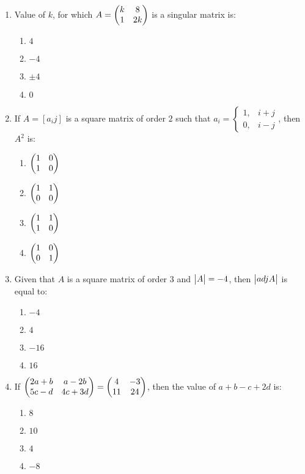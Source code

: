 \documentclass{article}
\begin{document}
\begin{enumerate}
   \item Value of $k$, for which $A =\begin{pmatrix}k & 8 \\ 1 & 2k\end{pmatrix}$ is a singular matrix is:
    \begin{enumerate}
        \item $4$
        \item $-4$
        \item $\pm4$
        \item $0$
    \end{enumerate}
        

    \item If $A = [a_{i}{j}]$ is a square matrix of order $2$ such that $a_{i} = \begin{cases}1, & i + j \\0, & i-j
    \end{cases}$, then $A^2$ is:
    \begin{enumerate}
        \item $\begin{pmatrix}1 & 0 \\ 1 & 0\end{pmatrix}$
        \item $\begin{pmatrix}1 & 1 \\ 0 & 0\end{pmatrix}$
        \item $\begin{pmatrix}1 & 1 \\ 1 & 0\end{pmatrix}$
        \item $\begin{pmatrix}1 & 0 \\ 0 & 1\end{pmatrix}$
    \end{enumerate}

    \item Given that $A$ is a square matrix of order $3$ and $\begin{vmatrix}A\end{vmatrix} = -4$, then $\begin{vmatrix}adj A\end{vmatrix}$ is equal to:
    \begin{enumerate}
        \item $-4$
        \item $4$
        \item $-16$
        \item $16$
    \end{enumerate}
    
    \item If $\begin{pmatrix}2a+b & a-2b \\ 5c-d & 4c+3d\end{pmatrix} = \begin{pmatrix}4 & -3 \\ 11 & 24\end{pmatrix}$, then the value of $a + b - c + 2d$ is:
    \begin{enumerate}
        \item $8$
        \item $10$
        \item $4$ 
        \item $-8$
    \end{enumerate}


\end{enumerate}
\end{document}
